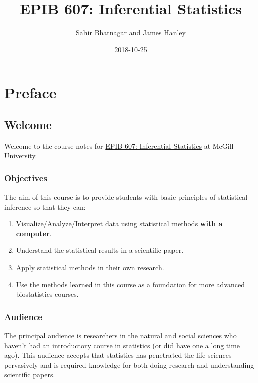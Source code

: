 \documentclass[]{book}
\title{EPIB 607: Inferential Statistics}
\author{Sahir Bhatnagar and James Hanley}
\date{2018-10-25}
\providecommand{\tightlist}{%
  \setlength{\itemsep}{0pt}\setlength{\parskip}{0pt}}
\providecommand{\tightlist}{%
  \setlength{\itemsep}{0pt}\setlength{\parskip}{0pt}}
\theoremstyle{definition}
\theoremstyle{definition}
\theoremstyle{definition}
\theoremstyle{remark}
\begin{document}
\maketitle

{
\setcounter{tocdepth}{1}
\tableofcontents
}
\part{Preface}\label{part-preface}

\chapter{Welcome}\label{welcome}

Welcome to the course notes for
\href{https://www.mcgill.ca/study/2018-2019/courses/epib-607}{EPIB 607:
Inferential Statistics} at McGill University.

\section{Objectives}\label{objectives}

The aim of this course is to provide students with basic principles of
statistical inference so that they can:

\begin{enumerate}
\def\labelenumi{\arabic{enumi}.}
\tightlist
\item
  Visualize/Analyze/Interpret data using statistical methods
  \textbf{with a computer}.
\item
  Understand the statistical results in a scientific paper.\\
\item
  Apply statistical methods in their own research.\\
\item
  Use the methods learned in this course as a foundation for more
  advanced biostatistics courses.
\end{enumerate}

\section{Audience}\label{audience}

The principal audience is researchers in the natural and social sciences
who haven't had an introductory course in statistics (or did have one a
long time ago). This audience accepts that statistics has penetrated the
life sciences pervasively and is required knowledge for both doing
research and understanding scientific papers.
\end{document}
